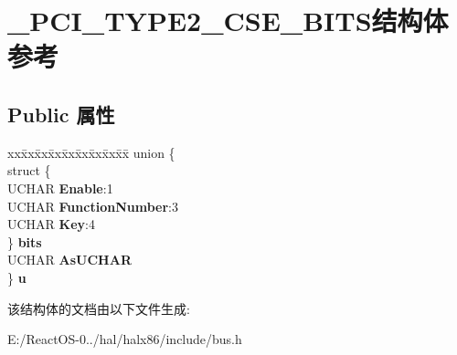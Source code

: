 \hypertarget{struct___p_c_i___t_y_p_e2___c_s_e___b_i_t_s}{}\section{\+\_\+\+P\+C\+I\+\_\+\+T\+Y\+P\+E2\+\_\+\+C\+S\+E\+\_\+\+B\+I\+T\+S结构体 参考}
\label{struct___p_c_i___t_y_p_e2___c_s_e___b_i_t_s}
\subsection*{Public 属性}
\begin{DoxyCompactItemize}
\item 
\mbox{\label{struct___p_c_i___t_y_p_e2___c_s_e___b_i_t_s_a86cf96903490f03ec1d7e8ad6ab6c06a}} 
\begin{tabbing}
xx\=xx\=xx\=xx\=xx\=xx\=xx\=xx\=xx\=\kill
union \{\\
\>struct \{\\
\>\>UCHAR {\bfseries Enable}:1\\
\>\>UCHAR {\bfseries FunctionNumber}:3\\
\>\>UCHAR {\bfseries Key}:4\\
\>\} {\bfseries bits}\\
\>UCHAR {\bfseries AsUCHAR}\\
\} {\bfseries u}\\

\end{tabbing}\end{DoxyCompactItemize}


该结构体的文档由以下文件生成\+:\begin{DoxyCompactItemize}
\item 
E\+:/\+React\+O\+S-\/0../hal/halx86/include/bus.\+h\end{DoxyCompactItemize}
